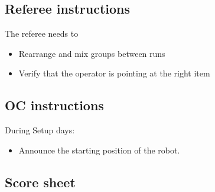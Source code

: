 \subsection*{Referee instructions}

The referee needs to
\begin{itemize}[nosep]
	\item Rearrange and mix groups between runs
	\item Verify that the operator is pointing at the right item
\end{itemize}

\subsection*{OC instructions}
During Setup days:
\begin{itemize}[nosep]
	\item Announce the starting position of the robot.
\end{itemize}


\subsection*{Score sheet}


